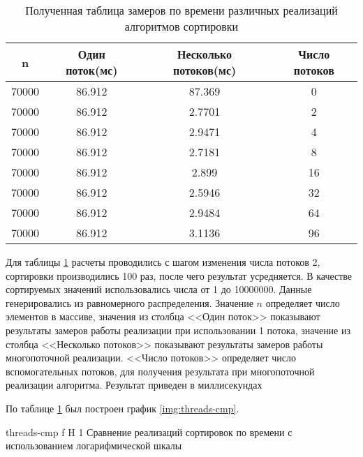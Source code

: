 \begin{table}[ht]
	\centering
	\caption{Полученная таблица замеров по времени различных реализаций алгоритмов сортировки}
	\begin{tabular}{|c|c|c|c|}
		\hline
		n     & Один поток(мс) & Несколько потоков(мс) & Число потоков \\ \hline
		70000 & 86.912                  & 87.369                                  & 0             \\ \hline
		70000 & 86.912                  & 2.7701                                  & 2             \\ \hline
		70000 & 86.912                  & 2.9471                                  & 4             \\ \hline
		70000 & 86.912                  & 2.7181                                  & 8             \\ \hline
		70000 & 86.912                  & 2.899                                   & 16            \\ \hline
		70000 & 86.912                  & 2.5946                                  & 32            \\ \hline
		70000 & 86.912                  & 2.9484                                  & 64            \\ \hline
		70000 & 86.912                  & 3.1136                                  & 96            \\ \hline
	\end{tabular}
	\label{t:timings}
\end{table}
Для таблицы \ref{t:timings} расчеты проводились с шагом изменения числа потоков 2, сортировки производились 100 раз, после чего результат усредняется. В качестве сортируемых значений использовались  числа от 1 до 10000000. Данные генерировались из равномерного распределения.
Значение $n$ определяет число элементов в массиве, значения из столбца <<Один поток>> показывают результаты замеров  работы реализации при использовании 1 потока, значение  из столбца <<Несколько потоков>> показывают результаты замеров работы многопоточной реализации. <<Число потоков>> определяет число вспомогательных потоков, для получения результата при многопоточной реализации алгоритма. Результат приведен в миллисекундах


По таблице \ref{t:timings} был построен график \ref{img:threads-cmp}. 

{threads-cmp} %
{f} %
{H} %
{1\textwidth} %
{Сравнение реализаций сортировок по времени с использованием логарифмической шкалы} %


